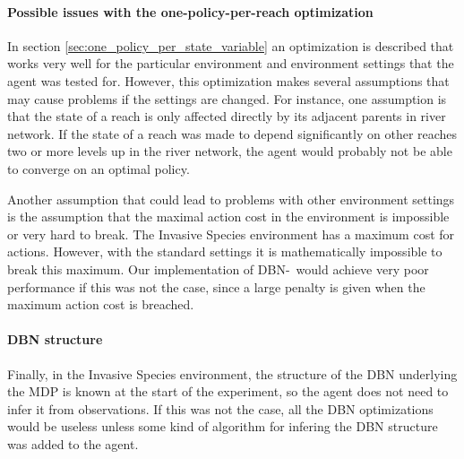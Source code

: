 \paragraph{Possible issues with the one-policy-per-reach optimization} In section \ref{sec:one_policy_per_state_variable} an optimization is described that works very well for the particular environment and environment settings that the agent was tested for. However, this optimization makes several assumptions that may cause problems if the settings are changed. For instance, one assumption is that the state of a reach is only affected directly by its adjacent parents in river network. If the state of a reach was made to depend significantly on other reaches two or more levels up in the river network, the agent would probably not be able to converge on an optimal policy. 

Another assumption that could lead to problems with other environment settings is the assumption that the maximal action cost in the environment is impossible or very hard to break. The Invasive Species environment has a maximum cost for actions. However, with the standard settings it is mathematically impossible to break this maximum. Our implementation of DBN-\etre\ would achieve very poor performance if this was not the case, since a large penalty is given when the maximum action cost is breached. 

\paragraph{DBN structure} Finally, in the Invasive Species environment, the structure of the DBN underlying the MDP is known at the start of the experiment, so the agent does not need to infer it from observations. If this was not the case, all the DBN optimizations would be useless unless some kind of algorithm for infering the DBN structure was added to the agent. 
